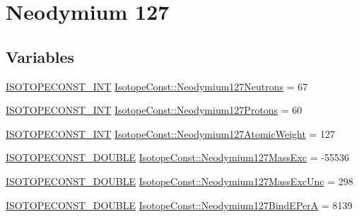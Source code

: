 \hypertarget{group___isotope_const-_neodymium-_nd127}{}\section{Neodymium 127}
\label{group___isotope_const-_neodymium-_nd127}
\subsection*{Variables}
\begin{DoxyCompactItemize}
\item 
\mbox{\hyperlink{group___isotope_const-_macros_ga5f18360b3e99483a35c32d789e62621c}{I\+S\+O\+T\+O\+P\+E\+C\+O\+N\+S\+T\+\_\+\+I\+NT}} \mbox{\hyperlink{group___isotope_const-_neodymium-_nd127_ga7dcfe752253bf783058743675d75fab5}{Isotope\+Const\+::\+Neodymium127\+Neutrons}} = 67
\item 
\mbox{\hyperlink{group___isotope_const-_macros_ga5f18360b3e99483a35c32d789e62621c}{I\+S\+O\+T\+O\+P\+E\+C\+O\+N\+S\+T\+\_\+\+I\+NT}} \mbox{\hyperlink{group___isotope_const-_neodymium-_nd127_gaf0071a5b77dd9d4f7b145c4b82b37dd8}{Isotope\+Const\+::\+Neodymium127\+Protons}} = 60
\item 
\mbox{\hyperlink{group___isotope_const-_macros_ga5f18360b3e99483a35c32d789e62621c}{I\+S\+O\+T\+O\+P\+E\+C\+O\+N\+S\+T\+\_\+\+I\+NT}} \mbox{\hyperlink{group___isotope_const-_neodymium-_nd127_gab79c54218b74d1caa17076f3e61d1e5f}{Isotope\+Const\+::\+Neodymium127\+Atomic\+Weight}} = 127
\item 
\mbox{\hyperlink{group___isotope_const-_macros_ga8f45a7272ce02c0b4c65c44636ed719a}{I\+S\+O\+T\+O\+P\+E\+C\+O\+N\+S\+T\+\_\+\+D\+O\+U\+B\+LE}} \mbox{\hyperlink{group___isotope_const-_neodymium-_nd127_ga09b6b737398bc7596dd5a220c6926e35}{Isotope\+Const\+::\+Neodymium127\+Mass\+Exc}} = -\/55536
\item 
\mbox{\hyperlink{group___isotope_const-_macros_ga8f45a7272ce02c0b4c65c44636ed719a}{I\+S\+O\+T\+O\+P\+E\+C\+O\+N\+S\+T\+\_\+\+D\+O\+U\+B\+LE}} \mbox{\hyperlink{group___isotope_const-_neodymium-_nd127_ga5fc08266103206c92b88d24b04c71372}{Isotope\+Const\+::\+Neodymium127\+Mass\+Exc\+Unc}} = 298
\item 
\mbox{\hyperlink{group___isotope_const-_macros_ga8f45a7272ce02c0b4c65c44636ed719a}{I\+S\+O\+T\+O\+P\+E\+C\+O\+N\+S\+T\+\_\+\+D\+O\+U\+B\+LE}} \mbox{\hyperlink{group___isotope_const-_neodymium-_nd127_ga80508c8627b01ee0f417111197de86fd}{Isotope\+Const\+::\+Neodymium127\+Bind\+E\+PerA}} = 8139
\item 

\end{DoxyCompactItemize}
